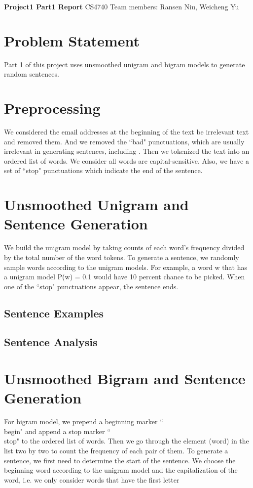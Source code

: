 \documentclass[a4paper, 11pt]{article}
\begin{document}
\noindent
\large\textbf{Project1 Part1 Report} \hfill 
\normalsize CS4740 \hfill Team members: Ransen Niu, Weicheng Yu \\

\section*{Problem Statement}
Part 1 of this project uses unsmoothed unigram and bigram models to generate random sentences.

\section*{Preprocessing}
We considered the email addresses at the beginning of the text be irrelevant text and removed them. And we removed the ``bad" punctuations, which are usually irrelevant in generating sentences, including . Then we tokenized the text into an ordered list of words.\newline
\newline
We consider all words are capital-sensitive. Also, we have a set of  ``stop" punctuations which indicate the end of the sentence.

\section*{Unsmoothed Unigram and Sentence Generation}
We build the unigram model by taking counts of each word's frequency divided by the total number of the word tokens. To generate a sentence, we randomly sample words according to the unigram models. For example, a word w that has a unigram model {P(w) = 0.1} would have 10 percent chance to be picked. When one of the ``stop" punctuations appear, the sentence ends.

\subsection*{Sentence Examples}
\subsection*{Sentence Analysis}

\section*{Unsmoothed Bigram and Sentence Generation}
For bigram model, we prepend a beginning marker ``\\begin" and append a stop marker ``\\stop" to the ordered list of words. Then we go through the element (word) in the list two by two to count the frequency of each pair of them. To generate a sentence, we first need to determine the start of the sentence. We choose the beginning word according to the unigram model and the capitalization of the word, i.e. we only consider words that have the first letter 
\end{document}

